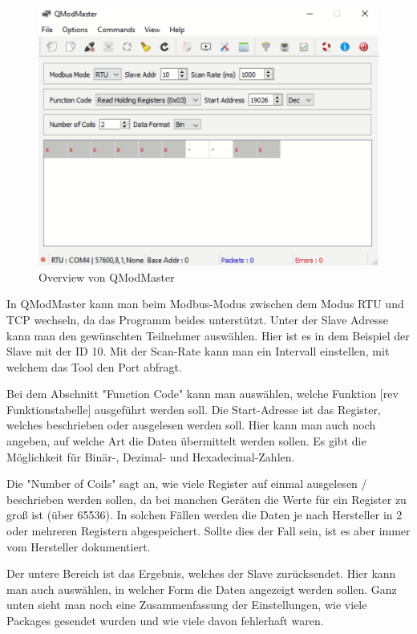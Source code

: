 \begin{figure}[h p] 
    \centering
    \includegraphics[scale=0.35]{pics/QmodMasterverview.png}
    \caption{Overview von QModMaster }
    \label{fig:impl:QmodMasterverview}
\end{figure}


In QModMaster kann man beim Modbus-Modus zwischen dem Modus RTU und TCP wechseln, da das Programm beides unterstützt. Unter der Slave Adresse kann man den gewünschten Teilnehmer auswählen. Hier ist es in dem Beispiel der Slave mit der ID 10. Mit der Scan-Rate kann man ein Intervall einstellen, mit welchem das Tool den Port abfragt.   

Bei dem Abschnitt "Function Code" kann man auswählen, welche Funktion [rev Funktionstabelle] ausgeführt werden soll. Die Start-Adresse ist das Register, welches beschrieben oder ausgelesen werden soll. Hier kann man auch noch angeben, auf welche Art die Daten übermittelt werden sollen. Es gibt die Möglichkeit für Binär-, Dezimal- und Hexadecimal-Zahlen. 

Die "Number of Coils" sagt an, wie viele Register auf einmal ausgelesen / beschrieben werden sollen, da bei manchen Geräten die Werte für ein Register zu groß ist (über 65536). In solchen Fällen werden die Daten je nach Hersteller in 2 oder mehreren Registern abgespeichert. Sollte dies der Fall sein, ist es aber immer vom Hersteller dokumentiert.   

Der untere Bereich ist das Ergebnis, welches der Slave zurücksendet. Hier kann man auch auswählen, in welcher Form die Daten angezeigt werden sollen. Ganz unten sieht man noch eine Zusammenfassung der Einstellungen, wie viele Packages gesendet wurden und wie viele davon fehlerhaft waren.   

